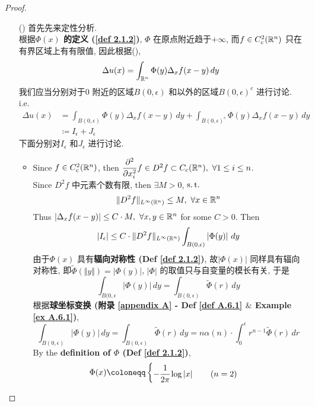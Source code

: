 \begin{thm}
\begin{proof}
\begin{enumerate}
				\item[(\rmnum{2})] 首先先来定性分析. \\
				根据\textbf{$\Phi(x)$ 的定义 (\ref{def 2.1.2})}, $\Phi$ 在原点附近趋于$+ \infty$, 而$f \in C_{c}^2 (\mathbb{R}^n)$ 只在有界区域上有有限值, 因此根据(), 
				\[ \Delta u(x) = \int_{\mathbb{R}^n} \Phi(y) \Delta_x f(x - y) \, dy \]
				我们应当分别对于$0$ 附近的区域$B(0 , \epsilon)$ 和以外的区域$B(0 , \epsilon)^c$ 进行讨论. i.e.
				\begin{align}
					\Delta u(x) 
					&= \int_{B(0 , \epsilon)} \Phi(y) \Delta_x f(x - y) \, dy + \int_{B(0 , \epsilon)^c} \Phi(y) \Delta_x f(x - y) \, dy \\
					&\coloneqq I_\epsilon + J_\epsilon
				\end{align}
				下面分别对$I_\epsilon$ 和$J_\epsilon$ 进行讨论. 
				\begin{itemize}
					\item Since $f \in C_{c}^2 (\mathbb{R}^n)$, then $\dfrac{\partial^2}{\partial x_{i}^2} f \in D^2 f \subset C_{c}(\mathbb{R}^n) , \,\, \forall 1 \leq i \leq n$. \\
					Since $D^2 f$ 中元素个数有限, then $\exists M > 0$, $\operatorname{s.t.}$ 
					\[ \Vert D^2 f \Vert_{L^\infty (\mathbb{R}^n)} \leq M , \,\, \forall x \in \mathbb{R}^n \]
					Thus $\left| \Delta_x f(x - y) \right| \leq C \cdot M , \,\, \forall x , y \in \mathbb{R}^n$ for some $C > 0$. Then
					\begin{align}
						\left| I_\epsilon \right| 
						\leq C \cdot \Vert D^2 f \Vert_{L^\infty (\mathbb{R}^n)} \int_{B(0 , \epsilon)} \left| \Phi(y) \right| \, dy
					\end{align}
					由于$\Phi(x)$ 具有\textbf{辐向对称性 (Def \ref{def 2.1.2})}, 故$\left| \Phi(x) \right|$ 同样具有辐向对称性, 即$\widetilde{\Phi}(\Vert y \Vert) = \left| \Phi(y) \right|$, $\left| \Phi \right|$ 的取值只与自变量的模长有关, 于是
					\[ \int_{B(0 , \epsilon} \left| \Phi(y) \right| \, dy = \int_{B(0 , \epsilon)} \widetilde{\Phi} (r) \, dy \]
					根据\textbf{球坐标变换 (附录 \ref{appendix A} - Def \ref{def A.6.1} $\&$ Example \ref{ex A.6.1})}, 
					\[
						\int_{B(0 , \epsilon)} \left| \Phi(y) \right| \, dy 
						= \int_{B(0 , \epsilon)} \widetilde{\Phi} (r) \, dy 
						= n \alpha(n) \cdot \int_{0}^\epsilon r^{n - 1} \widetilde{\Phi} (r) \, dr
					\]
					By the \textbf{definition of $\Phi$ (Def \ref{def 2.1.2})}, 
					\begin{align}
						\Phi(x) \coloneqq 
						\begin{cases}
							-\cfrac{1}{2 \pi} \log \left| x \right| \hspace*{2em} (n = 2) \\

\end{cases}
\end{align}
\end{itemize}
\end{enumerate}
\end{proof}
\end{thm}
